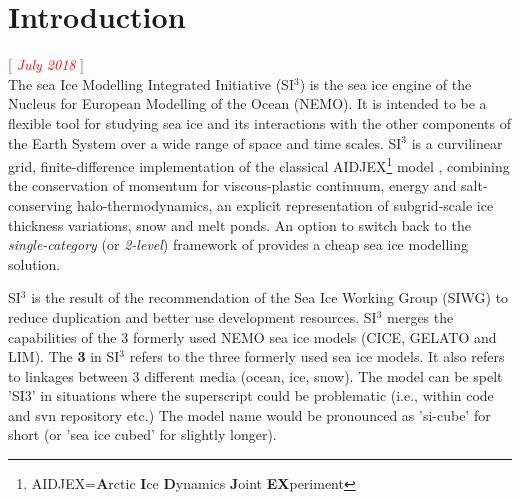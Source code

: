 

\chapter*{Introduction}

\textcolor{red}{[ \textit{July 2018} ]} \\


The sea Ice Modelling Integrated Initiative (SI$^3$) is the sea ice engine of the Nucleus for European Modelling of the Ocean (NEMO). It is intended to be a flexible tool for studying sea ice and its interactions with the other components of the Earth System over a wide range of space and time scales. SI$^3$ is a curvilinear grid, finite-difference implementation of the classical AIDJEX\footnote{AIDJEX=\textbf{A}rctic \textbf{I}ce \textbf{D}ynamics \textbf{J}oint \textbf{EX}periment} model \citep{Coonetal74}, combining the conservation of momentum for viscous-plastic continuum, energy and salt-conserving halo-thermodynamics, an explicit representation of subgrid-scale ice thickness variations, snow and melt ponds. An option to switch back to the \textit{single-category} (or \textit{2-level}) framework of \cite{Hibler79} provides a cheap sea ice modelling solution.

SI$^3$ is the result of the recommendation of the Sea Ice Working Group (SIWG) to reduce duplication and better use development resources. SI$^3$ merges the capabilities of the 3 formerly used NEMO sea ice models (CICE, GELATO and LIM). The \textbf{3} in SI$^3$ refers to the three formerly used sea ice models. It also refers to linkages between 3 different media (ocean, ice, snow). The model can be spelt 'SI3' in situations where the superscript could be problematic (i.e., within code and svn repository etc.) The model name would be pronounced as 'si-cube' for short (or 'sea ice cubed' for slightly longer). 

